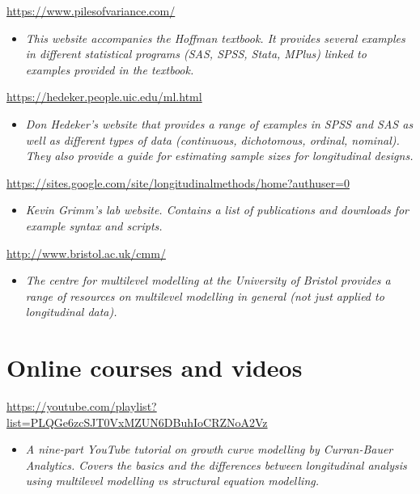 \documentclass[
]{book}
\providecommand{\tightlist}{%
  \setlength{\itemsep}{0pt}\setlength{\parskip}{0pt}}
\begin{document}
\url{https://www.pilesofvariance.com/}

\begin{itemize}
\tightlist
\item
  \emph{This website accompanies the Hoffman textbook. It provides several examples in different statistical programs (SAS, SPSS, Stata, MPlus) linked to examples provided in the textbook. }
\end{itemize}

\url{https://hedeker.people.uic.edu/ml.html}

\begin{itemize}
\tightlist
\item
  \emph{Don Hedeker's website that provides a range of examples in SPSS and SAS as well as different types of data (continuous, dichotomous, ordinal, nominal). They also provide a guide for estimating sample sizes for longitudinal designs. }
\end{itemize}

\url{https://sites.google.com/site/longitudinalmethods/home?authuser=0}

\begin{itemize}
\tightlist
\item
  \emph{Kevin Grimm's lab website. Contains a list of publications and downloads for example syntax and scripts. }
\end{itemize}

\url{http://www.bristol.ac.uk/cmm/}

\begin{itemize}
\tightlist
\item
  \emph{The centre for multilevel modelling at the University of Bristol provides a range of resources on multilevel modelling in general (not just applied to longitudinal data). }
\end{itemize}

\section{Online courses and videos}\label{online-courses-and-videos-1}

\url{https://youtube.com/playlist?list=PLQGe6zcSJT0VxMZUN6DBuhIoCRZNoA2Vz}

\begin{itemize}
\tightlist
\item
  \emph{A nine-part YouTube tutorial on growth curve modelling by Curran-Bauer Analytics. Covers the basics and the differences between longitudinal analysis using multilevel modelling vs structural equation modelling.}
\end{itemize}
\end{document}
